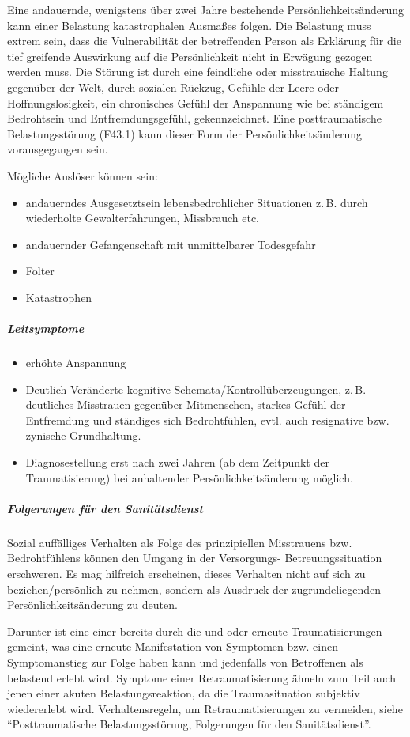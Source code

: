 {Eine andauernde, wenigstens über zwei Jahre bestehende
Persönlichkeitsänderung kann einer Belastung katastrophalen
Ausmaßes folgen. Die Belastung muss extrem sein, dass die
Vulnerabilität der betreffenden Person als Erklärung für die
tief greifende Auswirkung auf die Persönlichkeit nicht in
Erwägung gezogen werden muss. Die Störung ist durch eine
feindliche oder misstrauische Haltung gegenüber der Welt,
durch sozialen Rückzug, Gefühle der Leere oder
Hoffnungslosigkeit, ein chronisches Gefühl der Anspannung
wie bei ständigem Bedrohtsein und Entfremdungsgefühl,
gekennzeichnet. Eine posttraumatische Belastungsstörung
(F43.1) kann dieser Form der Persönlichkeitsänderung
vorausgegangen sein.

Mögliche Auslöser können sein:
\begin{itemize}
  \item andauerndes Ausgesetztsein lebensbedrohlicher
  Situationen z.\,B. durch wiederholte Gewalterfahrungen,
  Missbrauch etc.
  \item andauernder Gefangenschaft mit unmittelbarer Todesgefahr
  \item Folter
  \item Katastrophen
\end{itemize}
\subparagraph{Leitsymptome}
\begin{itemize}
  \item erhöhte Anspannung
  \item Deutlich Veränderte kognitive
  Schemata/Kontrollüberzeugungen, z.\,B. deutliches
  Misstrauen gegenüber Mitmenschen, starkes Gefühl  der
  Entfremdung und ständiges sich Bedrohtfühlen, evtl. auch
  resignative bzw. zynische Grundhaltung.
  \item Diagnosestellung erst nach zwei Jahren (ab dem
  Zeitpunkt der Traumatisierung) bei anhaltender
  Persönlichkeitsänderung möglich.
\end{itemize}

\subparagraph{Folgerungen für den Sanitätsdienst} Sozial auffälliges
Verhalten als Folge des prinzipiellen Misstrauens bzw.
Bedrohtfühlens können den Umgang in der Versorgungs-
Betreuungssituation erschweren. Es mag hilfreich erscheinen,
dieses Verhalten nicht auf sich zu beziehen/persönlich zu
nehmen, sondern als Ausdruck der zugrundeliegenden
Persönlichkeitsänderung zu deuten.}
{}
{}
{}
{}


{Darunter ist eine  einer bereits
 durch die
 und oder
erneute Traumatisierungen gemeint, was eine erneute
Manifestation von Symptomen bzw. einen Symptomanstieg zur
Folge haben kann und jedenfalls von Betroffenen als
belastend erlebt wird. Symptome einer Retraumatisierung
ähneln zum Teil auch jenen einer akuten Belastungsreaktion,
da die Traumasituation subjektiv wiedererlebt wird.
Verhaltensregeln, um Retraumatisierungen zu vermeiden, siehe
\enquote{Posttraumatische Belastungsstörung, Folgerungen für
den Sanitätsdienst}.}
{}
{}
{}
{}

